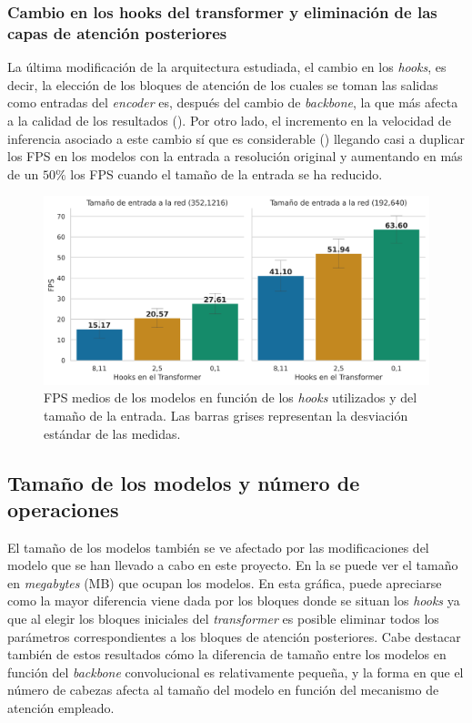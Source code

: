 \subsubsection{Cambio en los hooks del transformer y eliminación de las capas de atención posteriores}\label{resultados-cuantitativos-hooks}
La última modificación de la arquitectura estudiada, el cambio en los \textit{hooks}, es decir, la elección de los bloques de atención de los cuales se toman las salidas como entradas del \textit{encoder} es, después del cambio de \textit{backbone}, la que más afecta a la calidad de los resultados (). Por otro lado, el incremento en la velocidad de inferencia asociado a este cambio sí que es considerable () llegando casi a duplicar los FPS en los modelos con la entrada a resolución original y aumentando en más de un $50\%$ los FPS cuando el tamaño de la entrada se ha reducido.

\begin{figure}[H]
\centering
\includegraphics[width=0.85\linewidth]{imagenes/Resultados/velocidad_inferencia_hooks.png} 
\captionsetup{width=.9\linewidth}
\caption{FPS medios de los modelos en función de los \textit{hooks} utilizados y del tamaño de la entrada. Las barras grises representan la desviación estándar de las medidas.}
\label{fig:resultados-inf-hooks}
\end{figure}















\subsection{Tamaño de los modelos y número de operaciones}
El tamaño de los modelos también se ve afectado por las modificaciones del modelo que se han llevado a cabo en este proyecto. En la  se puede ver el tamaño en \textit{megabytes} (MB) que ocupan los modelos. En esta gráfica, puede apreciarse como la mayor diferencia viene dada por los bloques donde se situan los \textit{hooks} ya que al elegir los bloques iniciales del \textit{transformer} es posible eliminar todos los parámetros correspondientes a los bloques de atención posteriores. Cabe destacar también de estos resultados cómo la diferencia de tamaño entre los modelos en función del \textit{backbone} convolucional es relativamente pequeña, y la forma en que el número de cabezas afecta al tamaño del modelo en función del mecanismo de atención empleado.


